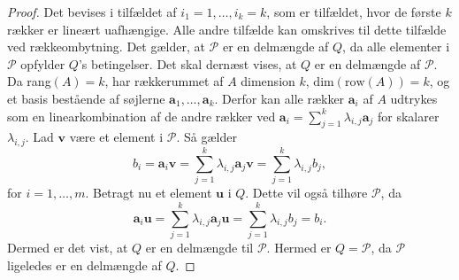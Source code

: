 \begin{proof}
Det bevises i tilfældet af $i_1=1,\ldots,i_k=k$, som er tilfældet, hvor de første $k$ rækker er lineært uafhængige. 
Alle andre tilfælde kan omskrives til dette tilfælde ved rækkeombytning. 
Det gælder, at $\mathcal{P}$ er en delmængde af $Q$, da alle elementer i $\mathcal{P}$ opfylder $Q$'s betingelser.
Det skal dernæst vises, at $Q$ er en delmængde af $\mathcal{P}$.
Da rang$(A)=k$, har rækkerummet af $A$ dimension $k$, $\text{dim}(\text{row}(A)) = k$, og et basis bestående af søjlerne $\textbf{a}_1,\ldots,\textbf{a}_k$. 
Derfor kan alle rækker $\textbf{a}_i$ af $A$ udtrykes som en linearkombination af de andre rækker ved $\textbf{a}_i=\sum^{k}_{j=1}\lambda_{i,j}\textbf{a}_j$ for skalarer $\lambda_{i,j}$. 
Lad $\textbf{v}$ være et element i $\mathcal{P}$. 
Så gælder
$$b_i=\textbf{a}_i\textbf{v}=\sum^{k}_{j=1}\lambda_{i,j}\textbf{a}_j\textbf{v}=\sum^{k}_{j=1}\lambda_{i,j}b_j,$$
for $i=1,\ldots,m.$
Betragt nu et element $\textbf{u}$ i $Q$. 
Dette vil også tilhøre $\mathcal{P}$, da
$$ \textbf{a}_i\textbf{u}=\sum^{k}_{j=1}\lambda_{i,j}\textbf{a}_j\textbf{u}=\sum^{k}_{j=1}\lambda_{i,j}b_j=b_i.$$
Dermed er det vist, at $Q$ er en delmængde til $\mathcal{P}$.
Hermed er $Q=\mathcal{P}$, da $\mathcal{P}$ ligeledes er en delmængde af $Q$.
\end{proof} \\